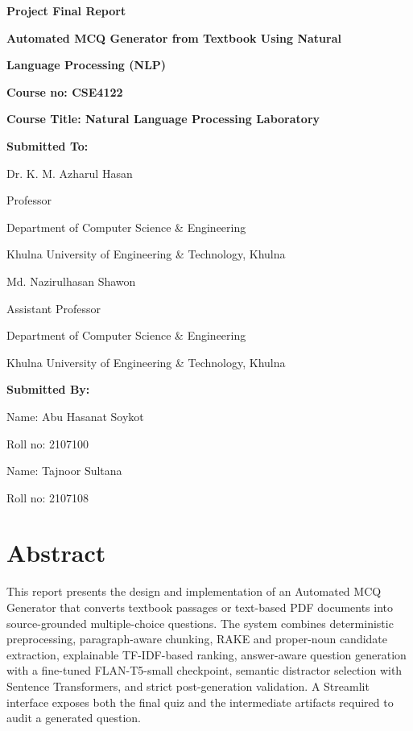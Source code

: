 \documentclass[12pt,a4paper]{report}
\begin{document}
\hypersetup{pageanchor=false}
\begin{titlepage}
\thispagestyle{empty}
\begin{center}
\vspace*{0.35in}
{\Large\bfseries Project Final Report\par}
\vspace{0.25in}
{\Large\bfseries Automated MCQ Generator from Textbook Using Natural\par}
{\Large\bfseries Language Processing (NLP)\par}
\vspace{0.45in}
\textbf{Course no: CSE4122}\par
\textbf{Course Title: Natural Language Processing Laboratory}\par
\vspace{0.45in}
\textbf{Submitted To:}\par
\vspace{0.12in}
Dr. K. M. Azharul Hasan\par
Professor\par
Department of Computer Science \& Engineering\par
Khulna University of Engineering \& Technology, Khulna\par
\vspace{0.25in}
Md. Nazirulhasan Shawon\par
Assistant Professor\par
Department of Computer Science \& Engineering\par
Khulna University of Engineering \& Technology, Khulna\par
\vspace{0.45in}
\textbf{Submitted By:}\par
\vspace{0.12in}
Name: Abu Hasanat Soykot\par
Roll no: 2107100\par
\vspace{0.12in}
Name: Tajnoor Sultana\par
Roll no: 2107108\par
\vfill
\end{center}
\end{titlepage}

\hypersetup{pageanchor=true}
\chapter*{Abstract}
This report presents the design and implementation of an Automated MCQ Generator that converts textbook passages or text-based PDF documents into source-grounded multiple-choice questions. The system combines deterministic preprocessing, paragraph-aware chunking, RAKE and proper-noun candidate extraction, explainable TF-IDF-based ranking, answer-aware question generation with a fine-tuned FLAN-T5-small checkpoint, semantic distractor selection with Sentence Transformers, and strict post-generation validation. A Streamlit interface exposes both the final quiz and the intermediate artifacts required to audit a generated question.
\end{document}
